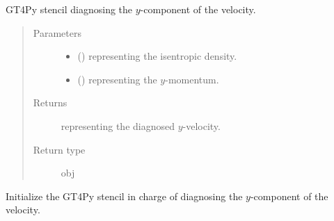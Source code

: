 \documentclass[letterpaper,10pt,english]{sphinxmanual}
\begin{document}
\begin{fulllineitems}
\begin{fulllineitems}
\label{\detokenize{api:tasmania.dycore.diagnostic_isentropic.DiagnosticIsentropic._stencil_diagnosing_velocity_y_defs}}
GT4Py stencil diagnosing the \(y\)-component of the velocity.
\begin{quote}\begin{description}
\item[{Parameters}] \leavevmode\begin{itemize}
\item {} 
 () \textendash{}  representing the isentropic density.

\item {} 
 () \textendash{}  representing the \(y\)-momentum.

\end{itemize}

\item[{Returns}] \leavevmode
{} representing the diagnosed \(y\)-velocity.

\item[{Return type}] \leavevmode
obj

\end{description}\end{quote}

\end{fulllineitems}


\begin{fulllineitems}
\label{\detokenize{api:tasmania.dycore.diagnostic_isentropic.DiagnosticIsentropic._stencil_diagnosing_velocity_y_initialize}}
Initialize the GT4Py stencil in charge of diagnosing the \(y\)-component of the velocity.

\end{fulllineitems}



\end{fulllineitems}
\end{document}
